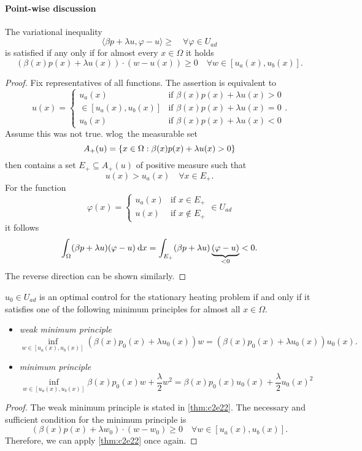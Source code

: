 \documentclass[../skript.tex]{subfiles}
\begin{document}
\paragraph{Point-wise discussion}
\begin{lemma} %
\label{thm:c2e22}
The variational inequality
\[
	\langle \beta p + \lambda u, \varphi - u \rangle \geq \quad \forall \varphi \in U_{ad}
\]
is satisfied if any only if for almost every $x \in \Omega$ it holds
\[
	\left( \beta(x) p(x) + \lambda u(x) \right) \cdot \left( w - u(x) \right) \geq 0 \quad \forall w \in [u_a(x), u_b(x)].
\]
\end{lemma}
\begin{proof}
Fix representatives of all functions.
The assertion is equivalent to
\[
	u(x) = \begin{cases}
	u_a(x) & \text{if } \beta(x) p(x) + \lambda u(x) > 0 \\
	\in [u_a(x), u_b(x)] & \text{if } \beta(x) p(x) + \lambda u(x) = 0 \\
	u_b(x) & \text{if } \beta(x) p(x) + \lambda u(x) < 0
	\end{cases}.
\]
Assume this was not true. \ac{wlog}\ the measurable set
\[
	A_+(u) = \{ x \in \Omega \mathrel{}:\mathrel{} \beta(x) p(x) + \lambda u(x) > 0 \}
\]
then contains a set $E_+ \subseteq A_+(u)$ of positive measure such that 
\[
	u(x) > u_a(x) \quad \forall x \in E_+.
\]
For the function
\[
	\varphi(x) = \begin{cases}
	u_a(x) & \text{if } x \in E_+ \\
	u(x) & \text{if } x \notin E_+
	\end{cases} \in U_{ad}
\]
it follows
\[
	\int_\Omega (\beta p + \lambda u ) (\varphi -u ) \:\mathrm{d}x = \int_{E_+} (\beta p + \lambda u )\underbrace{(\varphi - u)}_{< 0} < 0.
\]
The reverse direction can be shown similarly.
\end{proof}
\begin{theorem} %
\label{thm:c2e23}
$u_0 \in U_{ad}$ is an optimal control for the stationary heating problem if and only if it satisfies one of the following minimum principles for almost all $x \in \Omega$.
\begin{itemize}
\item \emph{weak minimum principle}
\[
	\inf_{w \in [u_a(x), u_b(x)]} \left( \beta(x) p_0(x) + \lambda u_0(x) \right) w = \left( \beta(x) p_0(x) + \lambda u_0(x) \right) u_0(x).
\]
\item \emph{minimum principle}
\[
	\inf_{w \in [u_a(x), u_b(x)]} \beta(x) p_0(x) w + \frac{\lambda}{2} w^2 = \beta(x) p_0(x) u_0(x) + \frac{\lambda}{2} u_0(x)^2
\]
\end{itemize}
\end{theorem}
\begin{proof}
The weak minimum principle is stated in \cref{thm:c2e22}.
The necessary and sufficient condition for the minimum principle is
\[
	\left( \beta(x) p(x) + \lambda w_0 \right) \cdot (w - w_0) \geq 0 \quad \forall w \in [u_a(x), u_b(x)].
\]
Therefore, we can apply \cref{thm:c2e22} once again.
\end{proof}
\end{document}
